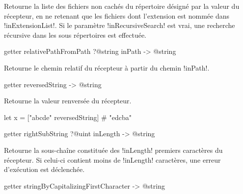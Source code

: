 Retourne la liste des fichiers non cachés du répertoire désigné par la valeur du récepteur, en ne retenant que les fichiers dont l'extension est nommée dans \ggs!inExtensionList!. Si le paramètre \ggs!inRecursiveSearch! est vrai, une recherche récursive dans les sous répertoires est effectuée.










\begin{galgasbox}
getter relativePathFromPath ?@string inPath -> @string
\end{galgasbox}

Retourne le chemin relatif du récepteur à partir du chemin \ggs!inPath!.










\begin{galgasbox}
getter reversedString -> @string
\end{galgasbox}

Retourne la valeur renversée du récepteur.

\begin{galgas}
let x = ["abcde" reversedString] # "edcba"
\end{galgas}









\begin{galgasbox}
getter rightSubString ?@uint inLength -> @string
\end{galgasbox}

Retourne la sous-chaîne constituée des \ggs!inLength! premiers caractères du récepteur. Si celui-ci contient moins de \ggs!inLength! caractères, une erreur d'exécution est déclenchée.









\begin{galgasbox}
getter stringByCapitalizingFirstCharacter -> @string
\end{galgasbox}


